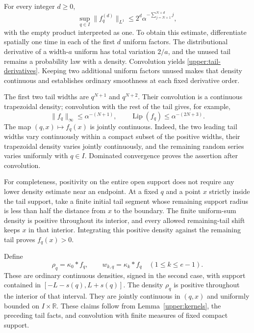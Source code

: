 \documentclass[11pt,letterpaper]{article}
\theoremstyle{definition}
\theoremstyle{remark}
\newcommand{\R}{\mathbb R}
\newcommand{\Lip}{\operatorname{Lip}}
\begin{document}
For every integer $d\ge0$,
\begin{equation}\label{upper:tail-derivatives}
 \sup_{q\in I}\|f_q^{(d)}\|_{L^1}
 \le 2^d\alpha^{-\sum_{j=N+1}^{N+d}j},
\end{equation}
with the empty product interpreted as one.  To obtain this estimate,
differentiate spatially one time in each of the first $d$ uniform factors.
The distributional derivative of a width-$a$ uniform has total variation
$2/a$, and the unused tail remains a probability law with a density.
Convolution yields \eqref{upper:tail-derivatives}.  Keeping two additional
uniform factors unused makes that density continuous and establishes
ordinary smoothness at each fixed derivative order.

The first two tail widths are $q^{N+1}$ and $q^{N+2}$.  Their convolution
is a continuous trapezoidal density; convolution with the rest of the tail
gives, for example,
\begin{equation}\label{upper:tail-lipschitz}
 \|f_q\|_\infty\le\alpha^{-(N+1)},\qquad
 \Lip(f_q)\le\alpha^{-(2N+3)}.
\end{equation}
The map $(q,x)\mapsto f_q(x)$ is jointly continuous.  Indeed, the two
leading tail widths vary continuously within a compact subset of the
positive widths, their trapezoidal density varies jointly continuously,
and the remaining random series varies uniformly with $q\in I$.
Dominated convergence proves the assertion after convolution.

For completeness, positivity on the entire open support does not require
any lower density estimate near an endpoint.  At a fixed $q$ and a point
$x$ strictly inside the tail support, take a finite initial tail segment
whose remaining support radius is less than half the distance from $x$ to
the boundary.  The finite uniform-sum density is positive throughout its
interior, and every allowed remaining-tail shift keeps $x$ in that
interior.  Integrating this positive density against the remaining tail
proves $f_q(x)>0$.

Define
\begin{equation}\label{upper:rho-w}
 \rho_q=\kappa_0*f_q,\qquad
 w_{k,q}=\kappa_k*f_q\quad(1\le k\le e-1).
\end{equation}
These are ordinary continuous densities, signed in the second case, with
support contained in $[-L-s(q),L+s(q)]$.  The density $\rho_q$ is positive
throughout the interior of that interval.  They are jointly continuous in
$(q,x)$ and uniformly bounded on $I\times\R$.  These claims follow from
Lemma~\ref{upper:kernels}, the preceding tail facts, and convolution with
finite measures of fixed compact support.
\end{document}

